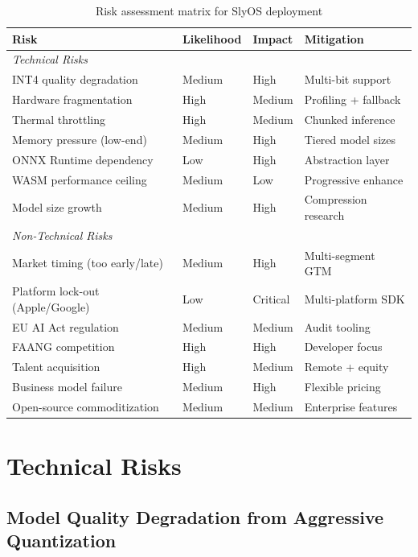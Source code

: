 \documentclass[12pt, letterpaper, twoside]{report}
\begin{document}
\begin{table}[H]
\centering
\caption{Risk assessment matrix for SlyOS deployment}
\label{tab:risk_matrix}
\small
\begin{tabular}{p{5.5cm}lll}
\toprule
\textbf{Risk} & \textbf{Likelihood} & \textbf{Impact} & \textbf{Mitigation} \\
\midrule
\multicolumn{4}{l}{\textit{Technical Risks}} \\[3pt]
INT4 quality degradation & Medium & High & Multi-bit support \\
Hardware fragmentation & High & Medium & Profiling + fallback \\
Thermal throttling & High & Medium & Chunked inference \\
Memory pressure (low-end) & Medium & High & Tiered model sizes \\
ONNX Runtime dependency & Low & High & Abstraction layer \\
WASM performance ceiling & Medium & Low & Progressive enhance \\
Model size growth & Medium & High & Compression research \\[6pt]
\multicolumn{4}{l}{\textit{Non-Technical Risks}} \\[3pt]
Market timing (too early/late) & Medium & High & Multi-segment GTM \\
Platform lock-out (Apple/Google) & Low & Critical & Multi-platform SDK \\
EU AI Act regulation & Medium & Medium & Audit tooling \\
FAANG competition & High & High & Developer focus \\
Talent acquisition & High & Medium & Remote + equity \\
Business model failure & Medium & High & Flexible pricing \\
Open-source commoditization & Medium & Medium & Enterprise features \\
\bottomrule
\end{tabular}
\end{table}

\section{Technical Risks}
\label{sec:technical_risks}

\subsection{Model Quality Degradation from Aggressive Quantization}
\label{subsec:quality_risk}
\end{document}
